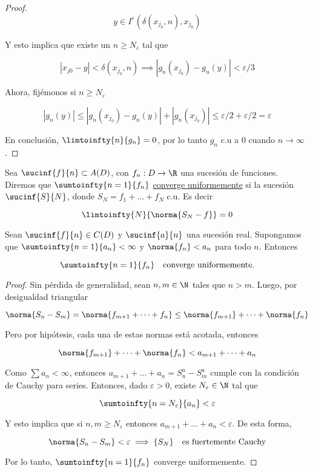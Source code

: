 \begin{proof}
    \[
    y \in I^{\varepsilon}\left(\delta(x_{j_0}, n), x_{j_0}\right)
    \]
    
    Y esto implica que existe un $n \geq N_{\varepsilon}$ tal que
    
    \[
    |x_{j0} - y| < \delta(x_{j_0}, n) \implies \left|g_n(x_{j_0}) - g_n(y)\right| < \varepsilon/3
    \]
    
    Ahora, fijémonos si $n \geq N_{\varepsilon}$
    
    \[
    |g_n(y)| \leq |g_n(x_{j_0}) - g_n(y)| + |g_n(x_{j_0})| \leq \varepsilon/2 + \varepsilon/2 = \varepsilon
    \]
    
    En conclusión, $\limtoinfty{n}{g_n} = 0$, por lo tanto $g_n$ c.u a $0$ cuando $n \rightarrow \infty$.
\end{proof}

\begin{defn}
    Sea $\sucinf{f}{n} \subset A(D)$, con $f_n : D \rightarrow \R$ una sucesión de funciones. Diremos que $\sumtoinfty{n=1}{f_n}$ \ul{converge uniformemente} si la sucesión $\sucinf{S}{N}$, donde $S_N = f_1 + \dots + f_N$ c.u. Es decir
    
    \[
    \limtoinfty{N}{\norma{S_N - f}} = 0
    \]
\end{defn}

\begin{teo}[Weierstrass]\label{teo:wei}
    Sean $\sucinf{f}{n} \in C(D)$ y $\sucinf{a}{n}$ una sucesión real. Supongamos que $\sumtoinfty{n=1}{a_n} < \infty$ y $\norma{f_n} < a_n$ para todo $n$. Entonces
    
    \[
    \sumtoinfty{n=1}{f_n} \quad \text{converge uniformemente.}
    \]
\end{teo}

\begin{proof}
    Sin pérdida de generalidad, sean $n,m \in \N$ tales que $n > m$. Luego, por desigualdad triangular
    
    \[
    \norma{S_n - S_m} = \norma{f_{m+1} + \dots + f_{n}} \leq \norma{f_{m+1}} + \dots + \norma{f_n}
    \]
    
    Pero por hipótesis, cada una de estas normas está acotada, entonces
    
    \[
    \norma{f_{m+1}} + \dots + \norma{f_n} < a_{m+1} + \dots + a_n
    \]
    
    Como $\sum a_n < \infty$, entonces $a_{m+1} + \dots + a_n = S_n^a - S_m^a$ cumple con la condición de Cauchy para series. Entonces, dado $\varepsilon > 0$, existe $N_{\varepsilon} \in \N$ tal que
    
    \[
    \sumtoinfty{n=N_{\varepsilon}}{a_n} < \varepsilon
    \]
    
    Y esto implica que si $n, m \geq N_{\varepsilon}$ entonces $a_{m+1} + \dots + a_n < \varepsilon$. De esta forma,
    
    \[
    \norma{S_n - S_m} < \varepsilon \implies \{S_N\} \quad \text{es fuertemente Cauchy}
    \]
    
    Por lo tanto, $\sumtoinfty{n=1}{f_n}$ converge uniformemente.
\end{proof}

